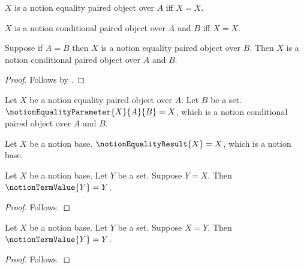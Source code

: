 


\begin{definition}\label{notion_equality_paired}
    $X$ is a notion equality paired object over $A$ iff $X=X$.
\end{definition}

\begin{definition}\label{notion_equality_conditional_result}
    $X$ is a notion conditional paired object over $A$ and $B$ iff $X=X$.
\end{definition}

\begin{classification}\label{notion_equality_conditional_classification}
    Suppose if $A=B$ then $X$ is a notion equality paired object over $B$.
    Then $X$ is a notion conditional paired object over $A$ and $B$.
\end{classification}
\begin{proof}
    Follows by .
\end{proof}

\begin{definition}\label{notion_equality_annotated_parameter}
    Let $X$ be a notion equality paired object over $A$.
    Let $B$ be a set.
    $\notionEqualityParameter{X}{A}{B}=X$, which is a notion conditional paired object over $A$ and $B$.
\end{definition}

\begin{definition}\label{notion_equality_annotated_result}
    Let $X$ be a notion base.
    $\notionEqualityResult{X}=X$, which is a notion base.
\end{definition}

\begin{proposition}\label{notion_equality_right_to_left}
    Let $X$ be a notion base.
    Let $Y$ be a set.
    Suppose $Y=X$.
    Then $\notionTermValue{Y}=Y$.
\end{proposition}
\begin{proof}
    Follows.
\end{proof}

\begin{proposition}\label{notion_equality_left_to_right}
    Let $X$ be a notion base.
    Let $Y$ be a set.
    Suppose $X=Y$.
    Then $\notionTermValue{Y}=Y$.
\end{proposition}
\begin{proof}
    Follows.
\end{proof}

